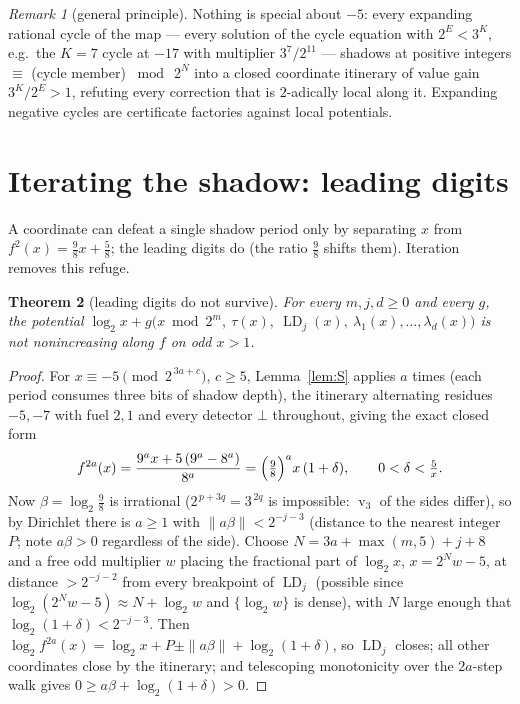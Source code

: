 \documentclass[11pt]{article}
\newtheorem{theorem}{Theorem}[section]
\theoremstyle{definition}
\theoremstyle{remark}
\newtheorem{remark}[theorem]{Remark}
\newcommand{\LD}{\operatorname{LD}}
\DeclareMathOperator{\vv}{v}
\begin{document}
\begin{remark}[general principle]\label{rem:factories}
Nothing is special about $-5$: every expanding rational cycle of the
map --- every solution of the cycle equation with $2^{E}<3^{K}$, e.g.\
the $K=7$ cycle at $-17$ with multiplier $3^{7}/2^{11}$ --- shadows at
positive integers $\equiv$ (cycle member) $\bmod\ 2^{N}$ into a closed
coordinate itinerary of value gain $3^{K}/2^{E}>1$, refuting every
correction that is $2$-adically local along it. Expanding negative
cycles are certificate factories against local potentials.
\end{remark}

\section{Iterating the shadow: leading digits}\label{sec:leading}

A coordinate can defeat a single shadow period only by separating $x$
from $f^{2}(x)=\tfrac98x+\tfrac58$; the leading digits do (the ratio
$\tfrac98$ shifts them). Iteration removes this refuge.

\begin{theorem}[leading digits do not survive]\label{thm:B}
For every $m,j,d\ge0$ and every $g$, the potential
$\log_2x+g\bigl(x\bmod2^m,\ \tau(x),\ \LD_j(x),\
\lambda_1(x),\dots,\lambda_d(x)\bigr)$ is not nonincreasing along $f$
on odd $x>1$.
\end{theorem}

\begin{proof}
For $x\equiv-5\pmod{2^{\,3a+c}}$, $c\ge5$, Lemma~\ref{lem:S} applies
$a$ times (each period consumes three bits of shadow depth), the
itinerary alternating residues $-5,-7$ with fuel $2,1$ and every
detector $\bot$ throughout, giving the exact closed form
\[
f^{2a}(x)=\frac{9^{a}x+5\,(9^{a}-8^{a})}{8^{a}}
=\Bigl(\tfrac98\Bigr)^{a}x\,(1+\delta),\qquad 0<\delta<\tfrac5x .
\]
Now $\beta=\log_2\tfrac98$ is irrational ($2^{\,p+3q}=3^{\,2q}$ is
impossible: $\vv_3$ of the sides differ), so by Dirichlet there is
$a\ge1$ with $\|a\beta\|<2^{-j-3}$ (distance to the nearest integer
$P$; note $a\beta>0$ regardless of the side). Choose
$N=3a+\max(m,5)+j+8$ and a free odd multiplier $w$ placing the
fractional part of $\log_2x$, $x=2^{N}w-5$, at distance $>2^{-j-2}$
from every breakpoint of $\LD_j$ (possible since
$\log_2(2^{N}w-5)\approx N+\log_2w$ and $\{\log_2w\}$ is dense), with
$N$ large enough that $\log_2(1+\delta)<2^{-j-3}$. Then
$\log_2f^{2a}(x)=\log_2x+P\pm\|a\beta\|+\log_2(1+\delta)$, so
$\LD_j$ closes; all other coordinates close by the itinerary; and
telescoping monotonicity over the $2a$-step walk gives
$0\ge a\beta+\log_2(1+\delta)>0$.
\end{proof}
\end{document}
